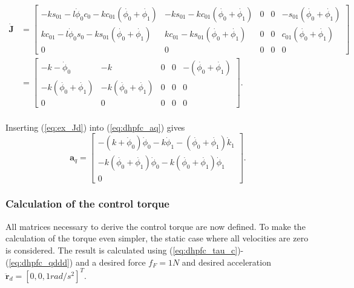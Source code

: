 \begin{equation}\label{eq:ex_Jd}
    \begin{split}
        \mathbf{\dot{J}}&=
        \begin{bmatrix}
            - k s_{01} -l \dot{\phi}_0c_0 -k c_{01}(\dot{\phi_0}+\dot{\phi_1}) & -k s_{01}-k c_{01}(\dot{\phi_0}+\dot{\phi_1}) & 0 & 0 & -s_{01}(\dot{\phi_0}+\dot{\phi_1}) \\
            k c_{01} -l \dot{\phi}_0s_0 -k s_{01}(\dot{\phi_0}+\dot{\phi_1}) & k c_{01}-k s_{01}(\dot{\phi_0}+\dot{\phi_1}) & 0 & 0 & c_{01}(\dot{\phi_0}+\dot{\phi_1}) \\
            0 & 0 & 0 & 0 & 0
        \end{bmatrix}\\&=
        \begin{bmatrix}
            - k -\dot{\phi}_0 & -k & 0 & 0 & -(\dot{\phi_0}+\dot{\phi_1}) \\
            -k(\dot{\phi_0}+\dot{\phi_1}) & -k(\dot{\phi_0}+\dot{\phi_1}) & 0 & 0 & 0\\
            0 & 0 & 0 & 0 & 0
        \end{bmatrix}.
    \end{split}
\end{equation}
\\
Inserting (\ref{eq:ex_Jd}) into (\ref{eq:dhpfc_aq}) gives
\begin{equation}
    \mathbf{a}_q =
    \begin{bmatrix}
            - (k +\dot{\phi}_0)\dot{\phi}_0 -k \dot{\phi}_1 -(\dot{\phi_0}+\dot{\phi_1})\dot{k}_1 \\
            -k(\dot{\phi_0}+\dot{\phi_1})\dot{\phi}_0 -k(\dot{\phi_0}+\dot{\phi_1})\dot{\phi}_1 \\
            0
        \end{bmatrix}.
\end{equation}

\subsubsection{Calculation of the control torque}

All matrices necessary to derive the control torque are now defined. To make the calculation of the torque even simpler, the static case where all velocities are zero is considered. The result is calculated using (\ref{eq:dhpfc_tau_c})-(\ref{eq:dhpfc_qddd}) and a desired force $f_F = 1 N$ and desired acceleration $\ddot{\mathbf{r}}_d = [0, 0, 1 rad/s^2]^T$.

